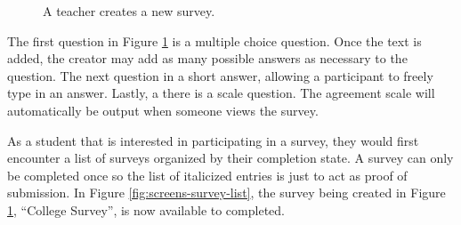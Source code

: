 \begin{figure}[p!]
	\centering
	\caption{A teacher creates a new survey.}
	\label{fig:screens-survey-new}
\end{figure}

The first question in Figure \ref{fig:screens-survey-new} is a multiple choice question. Once the text is added, the creator may add as many possible answers as necessary to the question. The next question in a short answer, allowing a participant to freely type in an answer. Lastly, a there is a scale question. The agreement scale will automatically be output when someone views the survey.

As a student that is interested in participating in a survey, they would first encounter a list of  surveys organized by their completion state. A survey can only be completed once so the list of italicized entries is just to act as proof of submission. In Figure \ref{fig:screens-survey-list}, the survey being created in Figure \ref{fig:screens-survey-new}, ``College Survey'', is now available to completed.

